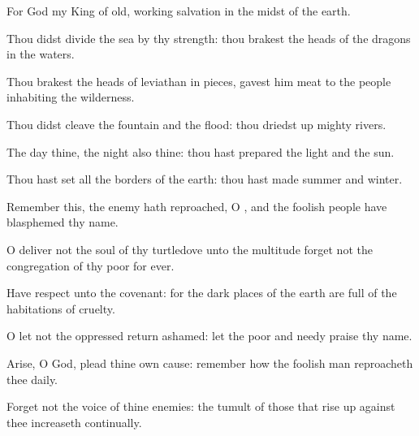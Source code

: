 {\Q {}For
God
{} my
King of
old,
working
salvation in the
midst of the
earth.


\par }{\Q {}Thou didst
divide the
sea by thy
strength: thou
brakest the
heads of the
dragons in the
waters.


\par }{\Q {}Thou
brakest the
heads of
leviathan in pieces,
{}
gavest him
{}
meat to the
people inhabiting the
wilderness.


\par }{\Q {}Thou didst
cleave the
fountain and the
flood: thou driedst
up
mighty
rivers.


\par }{\Q {}The
day
{} thine, the
night also
{} thine: thou hast
prepared the
light and the
sun.


\par }{\Q {}Thou hast
set all the
borders of the
earth: thou hast
made
summer and
winter.


\par }{\BB \par }
{\Q {}Remember this,
{} the
enemy hath
reproached, O
{}, and
{} the
foolish
people have
blasphemed thy
name.


\par }{\Q {}O
deliver not the
soul of thy
turtledove unto the
multitude
{}
forget not the
congregation of thy
poor for
ever.


\par }{\Q {}Have
respect unto the
covenant: for the
dark places of the
earth are
full of the
habitations of
cruelty.


\par }{\Q {}O let not the
oppressed
return
ashamed: let the
poor and
needy
praise thy
name.


\par }{\Q {}Arise, O
God,
plead thine own
cause:
remember how the foolish
man
reproacheth thee
daily.


\par }{\Q {}Forget not the
voice of thine
enemies: the
tumult of those that rise
up against thee
increaseth
continually.




\par }
